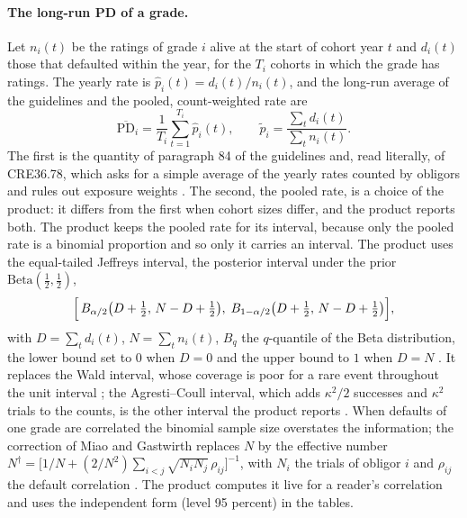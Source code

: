 \paragraph{The long-run PD of a grade.} Let $n_i(t)$ be the ratings of grade $i$ alive at the start of cohort year $t$ and $d_i(t)$ those that defaulted within the year, for the $T_i$ cohorts in which the grade has ratings. The yearly rate is $\hat p_i(t) = d_i(t)/n_i(t)$, and the long-run average of the guidelines and the pooled, count-weighted rate are
\begin{equation}
\overline{\mathrm{PD}}_i = \frac{1}{T_i}\sum_{t=1}^{T_i}\hat p_i(t),
\qquad
\tilde p_i = \frac{\sum_{t} d_i(t)}{\sum_{t} n_i(t)}.
\label{eq:ratings-lra}
\end{equation}
The first is the quantity of paragraph 84 of the guidelines \citep{ratings:eba2017} and, read literally, of CRE36.78, which asks for a simple average of the yearly rates counted by obligors and rules out exposure weights \citep{ratings:cre36}. The second, the pooled rate, is a choice of the product: it differs from the first when cohort sizes differ, and the product reports both. The product keeps the pooled rate for its interval, because only the pooled rate is a binomial proportion and so only it carries an interval. The product uses the equal-tailed Jeffreys interval, the posterior interval under the prior $\mathrm{Beta}(\tfrac12,\tfrac12)$,
\begin{equation}
\Bigl[\,B_{\alpha/2}\bigl(D+\tfrac12,\,N-D+\tfrac12\bigr),\; B_{1-\alpha/2}\bigl(D+\tfrac12,\,N-D+\tfrac12\bigr)\Bigr],
\label{eq:ratings-jeffreys}
\end{equation}
with $D = \sum_t d_i(t)$, $N = \sum_t n_i(t)$, $B_q$ the $q$-quantile of the Beta distribution, the lower bound set to $0$ when $D = 0$ and the upper bound to $1$ when $D = N$ \citep{ratings:brown2001,ratings:zhou2008}. It replaces the Wald interval, whose coverage is poor for a rare event throughout the unit interval \citep{ratings:brown2001}; the Agresti--Coull interval, which adds $\kappa^2/2$ successes and $\kappa^2$ trials to the counts, is the other interval the product reports \citep{ratings:agresti1998,ratings:schuermann2004}. When defaults of one grade are correlated the binomial sample size overstates the information; the correction of Miao and Gastwirth replaces $N$ by the effective number $N^{\dagger} = \bigl[1/N + (2/N^{2})\sum_{i<j}\sqrt{N_i N_j}\,\rho_{ij}\bigr]^{-1}$, with $N_i$ the trials of obligor $i$ and $\rho_{ij}$ the default correlation \citep{ratings:miao2004,ratings:schuermann2004}. The product computes it live for a reader's correlation and uses the independent form (level 95 percent) in the tables.

